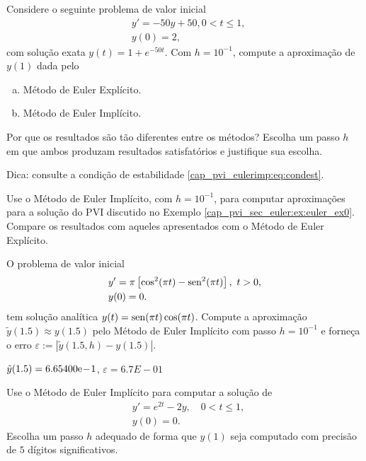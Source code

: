\begin{exer}
  Considere o seguinte problema de valor inicial
  \begin{subequations}
    \begin{align}
      &y' = -50y + 50, 0 < t \leq 1,\\
      &y(0) = 2,
    \end{align}
  \end{subequations}
  com solução exata $y(t) = 1 + e^{-50t}$. Com $h = 10^{-1}$, compute a aproximação de $y(1)$ dada pelo
  \begin{enumerate}[a)]
  \item Método de Euler Explícito.
  \item Método de Euler Implícito.
  \end{enumerate}
  Por que os resultados são tão diferentes entre os métodos? Escolha um passo $h$ em que ambos produzam resultados satisfatórios e justifique sua escolha.
\end{exer}
\begin{resp}
  Dica: consulte a condição de estabilidade \eqref{cap_pvi_eulerimp:eq:condest}.
\end{resp}

\begin{exer}
  Use o Método de Euler Implícito, com $h=10^{-1}$, para computar aproximações para a solução do PVI discutido no Exemplo \ref{cap_pvi_sec_euler:ex:euler_ex0}. Compare os resultados com aqueles apresentados com o Método de Euler Explícito.
\end{exer}

\begin{exer}
  O problema de valor inicial
  \begin{subequations}
    \begin{align}
      &y' = \pi\left[\cos^2(\pi t) - \operatorname{sen}^2(\pi t)\right], ~t>0,\\
      &y(0) = 0.
    \end{align}
  \end{subequations}
  tem solução analítica $y(t) = \operatorname{sen}(\pi t)\cos(\pi t)$. Compute a aproximação $\tilde{y}(1.5) \approx y(1.5)$ pelo Método de Euler Implícito com passo $h=10^{-1}$ e forneça o erro $\varepsilon := \left|\tilde{y}(1.5, h) - y(1.5)\right|$.
\end{exer}
\begin{resp}
  $\tilde{y}(1.5) = 6.65400\mathrm{e}\!-\!1$, $\varepsilon = 6.7E-01$
\end{resp}

\begin{exer}
  Use o Método de Euler Implícito para computar a solução de
  \begin{subequations}
    \begin{align}
      &y' = e^{2t} - 2y,\quad 0 < t\leq 1,\\
      &y(0) = 0.
    \end{align}
  \end{subequations}
  Escolha um passo $h$ adequado de forma que $y(1)$ seja computado com precisão de $5$ dígitos significativos.
\end{exer}

